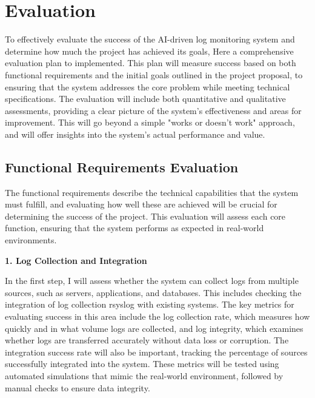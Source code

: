  \section{Evaluation}
To effectively evaluate the success of the AI-driven log monitoring system and determine how much the project has achieved its goals, Here a comprehensive evaluation plan to implemented. This plan will measure success based on both functional requirements and the initial goals outlined in the project proposal, to ensuring that the system addresses the core problem while meeting technical specifications. The evaluation will include both quantitative and qualitative assessments, providing a clear picture of the system’s effectiveness and areas for improvement. This will go beyond a simple "works or doesn’t work" approach, and will offer insights into the system's actual performance and value.




\subsection{Functional Requirements Evaluation}

The functional requirements describe the technical capabilities that the system must fulfill, and evaluating how well these are achieved will be crucial for determining the success of the project. This evaluation will assess each core function, ensuring that the system performs as expected in real-world environments.

\textbf{1. Log Collection and Integration}


In the first step, I will assess whether the system can collect logs from multiple sources, such as servers, applications, and databases. This includes checking the integration of log collection rsyslog with existing systems. The key metrics for evaluating success in this area include the log collection rate, which measures how quickly and in what volume logs are collected, and log integrity, which examines whether logs are transferred accurately without data loss or corruption. The integration success rate will also be important, tracking the percentage of sources successfully integrated into the system. These metrics will be tested using automated simulations that mimic the real-world environment, followed by manual checks to ensure data integrity.



